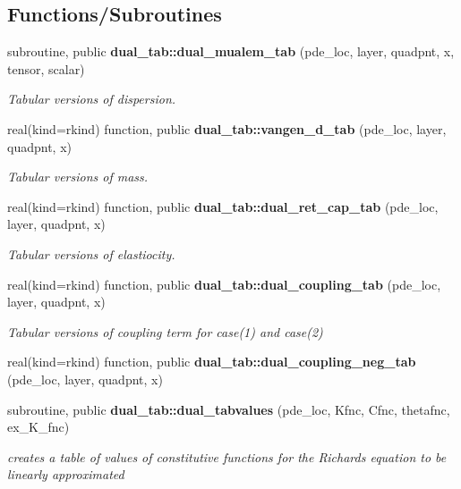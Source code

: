 \subsection*{Functions/\+Subroutines}
\begin{DoxyCompactItemize}
\item 
subroutine, public {\bf dual\+\_\+tab\+::dual\+\_\+mualem\+\_\+tab} (pde\+\_\+loc, layer, quadpnt, x, tensor, scalar)
\begin{DoxyCompactList}\small\item\em Tabular versions of dispersion. \end{DoxyCompactList}\item 
real(kind=rkind) function, public {\bf dual\+\_\+tab\+::vangen\+\_\+d\+\_\+tab} (pde\+\_\+loc, layer, quadpnt, x)
\begin{DoxyCompactList}\small\item\em Tabular versions of mass. \end{DoxyCompactList}\item 
real(kind=rkind) function, public {\bf dual\+\_\+tab\+::dual\+\_\+ret\+\_\+cap\+\_\+tab} (pde\+\_\+loc, layer, quadpnt, x)
\begin{DoxyCompactList}\small\item\em Tabular versions of elastiocity. \end{DoxyCompactList}\item 
real(kind=rkind) function, public {\bf dual\+\_\+tab\+::dual\+\_\+coupling\+\_\+tab} (pde\+\_\+loc, layer, quadpnt, x)
\begin{DoxyCompactList}\small\item\em Tabular versions of coupling term for case(1) and case(2) \end{DoxyCompactList}\item 
real(kind=rkind) function, public {\bf dual\+\_\+tab\+::dual\+\_\+coupling\+\_\+neg\+\_\+tab} (pde\+\_\+loc, layer, quadpnt, x)
\item 
subroutine, public {\bf dual\+\_\+tab\+::dual\+\_\+tabvalues} (pde\+\_\+loc, Kfnc, Cfnc, thetafnc, ex\+\_\+\+K\+\_\+fnc)
\begin{DoxyCompactList}\small\item\em creates a table of values of constitutive functions for the Richards equation to be linearly approximated \end{DoxyCompactList}\end{DoxyCompactItemize}
